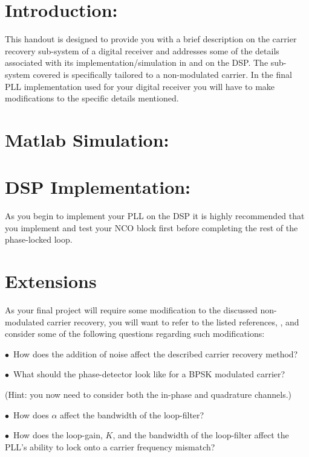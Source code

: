 \documentclass[11pt]{handout}
\newcommand{\blt}{\mbox{$\bullet$ }}
\begin{document}
\setlength{\baselineskip}{0.5cm}
\setlength{\parskip}{0.5cm}

\makeboxtitle
\vspace{0.3cm}

\section{Introduction:}

This handout is designed to provide you with a brief
description on the carrier recovery sub-system of a digital receiver 
and addresses some of the details associated with its 
implementation/simulation in \matlab and on the DSP.
The sub-system covered is specifically tailored to a
non-modulated carrier.  In the final PLL implementation used for
your digital receiver you will have to make modifications
to the specific details mentioned.



\section{Matlab Simulation:}



\section{DSP Implementation:}

As you begin to implement your PLL on the DSP it is highly
recommended that you implement and 
test your NCO block first before completing the rest
of the phase-locked loop.



\section{Extensions}

As your final project will require some modification to the discussed
non-modulated carrier recovery, you will want to refer to the listed 
references, \cite{Proakis1, Blahut1},
and consider some of the following questions regarding such 
modifications:

\blt How does the addition of noise affect the described carrier recovery 
method?

\blt What should the phase-detector look like for a BPSK modulated carrier?

\vspace*{-.1in}
\hspace{.1in} (Hint: you now need to consider both the in-phase and 
quadrature channels.)

\blt How does $\alpha$ affect the bandwidth of the loop-filter?

\blt How does the loop-gain, $K$, and the bandwidth of the loop-filter
affect the PLL's ability to lock onto a carrier frequency mismatch?



\end{document}
